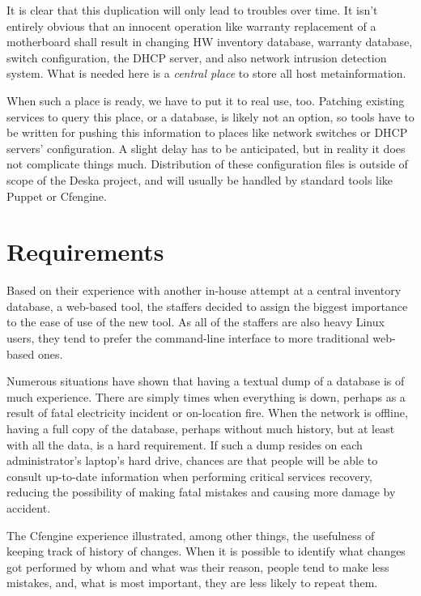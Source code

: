 \documentclass[11pt]{article}
\begin{document}
It is clear that this duplication will only lead to troubles over time.  It
isn't entirely obvious that an innocent operation like warranty replacement of a
motherboard shall result in changing HW inventory database, warranty database,
switch configuration, the DHCP server, and also network intrusion detection
system.  What is needed here is a {\em central place} to store all host
metainformation.

When such a place is ready, we have to put it to real use, too.  Patching
existing services to query this place, or a database, is likely not an option,
so tools have to be written for pushing this information to places like network
switches or DHCP servers' configuration.  A slight delay has to be anticipated,
but in reality it does not complicate things much.  Distribution of these
configuration files is outside of scope of the Deska project, and will usually
be handled by standard tools like Puppet or Cfengine.

\section{Requirements}

Based on their experience with another in-house attempt at a central inventory
database, a web-based tool, the staffers decided to assign the biggest
importance to the ease of use of the new tool.  As all of the staffers are also
heavy Linux users, they tend to prefer the command-line interface to more
traditional web-based ones.

Numerous situations have shown that having a textual dump of a database is of
much experience.  There are simply times when everything is down, perhaps as a
result of fatal electricity incident or on-location fire.  When the network is
offline, having a full copy of the database, perhaps without much history, but
at least with all the data, is a hard requirement.  If such a dump resides on
each administrator's laptop's hard drive, chances are that people will be able
to consult up-to-date information when performing critical services recovery,
reducing the possibility of making fatal mistakes and causing more damage by
accident.

The Cfengine experience illustrated, among other things, the usefulness of
keeping track of history of changes.  When it is possible to identify what
changes got performed by whom and what was their reason, people tend to make
less mistakes, and, what is most important, they are less likely to repeat them.
\end{document}
